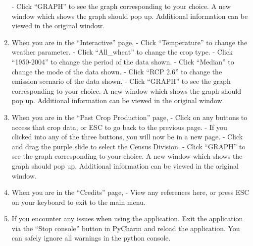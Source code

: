 \documentclass[fontsize=11pt]{article}
\begin{document}
\begin{enumerate}
    \subitem - Click “GRAPH” to see the graph corresponding to your choice. A new window which shows the graph should pop up. Additional information can be viewed in the original window.
    \item When you are in the “Interactive” page,
    \subitem - Click “Temperature” to change the weather parameter.
    \subitem - Click “All\_wheat” to change the crop type.
    \subitem - Click “1950-2004” to change the period of the data shown.
    \subitem - Click “Median” to change the mode of the data shown.
    \subitem - Click “RCP 2.6” to change the emission scenario of the data shown.
    \subitem - Click “GRAPH” to see the graph corresponding to your choice. A new window which shows the graph should pop up. Additional information can be viewed in the original window.    
    \item When you are in the “Past Crop Production” page,
    \subitem - Click on any buttons to access that crop data, or ESC to go back to the previous page.
    \subitem - If you clicked into any of the three buttons, you will now be in a new page.
    \subitem - Click and drag the purple slide to select the Census Division. 
    \subitem - Click “GRAPH” to see the graph corresponding to your choice. A new window which shows the graph should pop up. Additional information can be viewed in the original window.
    \item When you are in the “Credits” page,
    \subitem - View any references here, or press ESC on your keyboard to exit to the main menu.
    \item If you encounter any issues when using the application. Exit the application via the “Stop console” button in PyCharm and reload the application. You can safely ignore all warnings in the python console.
\end{enumerate}
\end{document}
